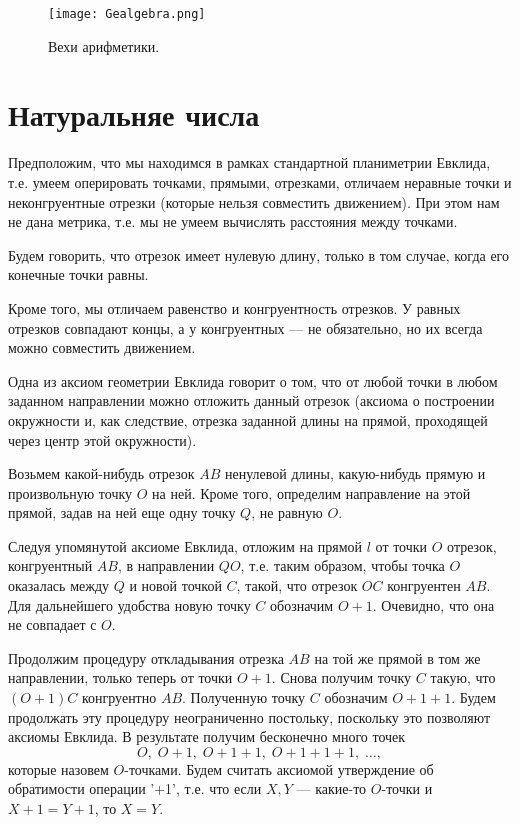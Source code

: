 
\begin{figure}[htb!]
\begin{center}
\texttt{[image: Gealgebra.png]}
\end{center}
\caption{Вехи арифметики.}\label{ariphmetics}
\end{figure}



\section{Натуральняе числа}


Предположим, что мы находимся в рамках стандартной планиметрии Евклида, т.е. умеем оперировать точками, прямыми, отрезками, отличаем неравные точки и неконгруентные отрезки (которые нельзя совместить движением). При этом нам не дана метрика, т.е. мы не умеем вычислять расстояния между точками.

Будем говорить, что отрезок имеет нулевую длину, только в том случае, когда его конечные точки равны.

Кроме того, мы отличаем равенство и конгруентность отрезков. У равных отрезков совпадают концы, а у конгруентных --- не обязательно, но их всегда можно совместить движением.

Одна из аксиом геометрии Евклида говорит о том, что от любой точки в любом заданном направлении можно отложить данный отрезок (аксиома о построении окружности и, как следствие, отрезка заданной длины на прямой, проходящей через центр этой окружности).

Возьмем какой-нибудь отрезок $AB$ ненулевой длины, какую-нибудь прямую и произвольную точку $O$ на ней. Кроме того, определим направление на этой прямой, задав на ней еще одну точку $Q$, не равную $O$.

Следуя упомянутой аксиоме Евклида, отложим на прямой $l$ от точки $O$ отрезок, конгруентный $AB$, в направлении $QO$, т.е. таким образом, чтобы точка $O$ оказалась между $Q$ и новой точкой $C$, такой, что отрезок $OC$ конгруентен $AB$. Для дальнейшего удобства новую точку $C$ обозначим $O+1$. Очевидно, что она не совпадает с $O$.

Продолжим процедуру откладывания отрезка $AB$ на той же прямой в том же направлении, только теперь от точки $O+1$. Снова получим точку $C$ такую, что $(O+1)C$ конгруентно $AB$. Полученную точку $C$ обозначим $O+1+1$. Будем продолжать эту процедуру неограниченно постольку, поскольку это позволяют аксиомы Евклида. В результате получим бесконечно много точек
$$
O,\;O+1,\;O+1+1,\;O+1+1+1,\;\dots,
$$
которые назовем $O$-точками. Будем считать аксиомой утверждение об обратимости операции '+1', т.е. что если $X,Y$ --- какие-то $O$-точки и $X+1=Y+1$, то $X=Y$.

